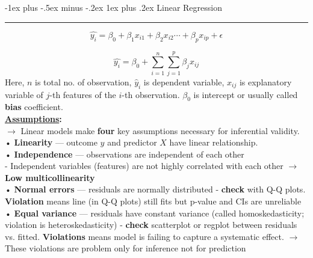 \documentclass[letterpaper, 10.5pt,landscape]{article}
\makeatletter
\renewcommand{\subsubsection}{\@startsection{subsubsection}{3}{0mm}%
                                {-1ex plus -.5ex minus -.2ex}%
                                {1ex plus .2ex}%
                                {\normalfont\small\bfseries}}
\makeatother
\begin{document}
\begin{multicols*}{3}
\subsubsection{Linear Regression} {\color{teal}\hrule height 0.5pt} \smallskip

\[\hat{y_{i}} = \beta_{0} + \beta_{1} x_{i1} + \beta_{2} x_{i2} \cdots + \beta_{p} x_{ip} + \epsilon  \]

\vspace{-7pt}

\[\boxed{\hat{y_{i}} = \beta_{0} + \sum^{n}_{i=1}\sum^{p}_{j=1}\beta_{j}x_{ij}}\]
Here, $n$ is total no. of observation, $\hat{y}_{i}$ is dependent variable, $x_{ij}$ is explanatory variable of $j$-th features of the $i$-th observation.
$\beta_{0}$ is intercept or usually called \textbf{bias} coefficient. \\



\textbf{\underline{Assumptions}:} \\
$\rightarrow$  Linear models make \textbf{four} key assumptions necessary for inferential
validity. \\
• \textbf{Linearity} — outcome $y$ and predictor $X$ have linear relationship. \\
• \textbf{Independence} — observations are independent of each other\\
- Independent variables (features) are not highly correlated with each other $\rightarrow$ \textbf{Low multicollinearity} \\
• \textbf{Normal errors} — residuals are normally distributed - \textbf{check} with Q-Q plots.\textbf{ Violation} means line (in Q-Q plots) still fits but p-value and CIs are unreliable\\
• \textbf{Equal variance} — residuals have constant variance (called
homoskedasticity; violation is heteroskedasticity) - \textbf{check} scatterplot or regplot between residuals vs. fitted. \textbf{Violations} means model is failing to capture a systematic effect. $\rightarrow$  These violations are problem only for inference not for prediction




\end{multicols*}
\end{document}
